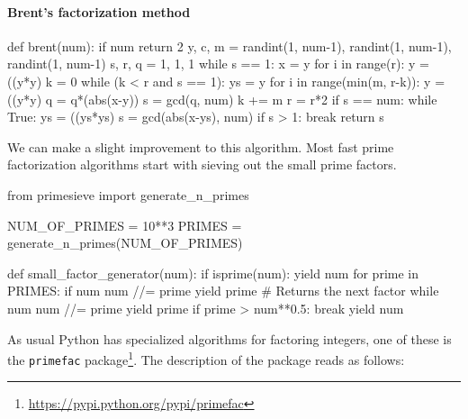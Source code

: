 \paragraph*{Brent's factorization method}
%
\begin{pythoncode}
	def brent(num):
	    if num %
	        return 2
	    y, c, m = randint(1, num-1), randint(1, num-1), randint(1, num-1)
	    s, r, q = 1, 1, 1
	    while s == 1:
	        x = y
	        for i in range(r):
	            y = ((y*y) %
	        k = 0
	        while (k < r and s == 1):
	            ys = y
	            for i in range(min(m, r-k)):
	                y = ((y*y) %
	                q = q*(abs(x-y)) %
	            s = gcd(q, num)
	            k += m
	        r = r*2
	    if s == num:
	        while True:
	            ys = ((ys*ys) %
	            s = gcd(abs(x-ys), num)
	            if s > 1:
	                break
	    return s
\end{pythoncode}
%
We can make a slight improvement to this algorithm. Most fast prime factorization algorithms start with sieving 
out the small prime factors. 
%
\begin{pythoncode}
	from primesieve import generate_n_primes
	
	NUM_OF_PRIMES = 10**3
	PRIMES = generate_n_primes(NUM_OF_PRIMES)
	
	def small_factor_generator(num):
	    if isprime(num):
	        yield num
	    for prime in PRIMES:
	        if num %
	            num //= prime
	            yield prime  # Returns the next factor
	            while num %
	                num //= prime
	                yield prime
	            if prime > num**0.5:
	                break
	    yield num
\end{pythoncode}
%
As usual Python has specialized algorithms for factoring integers, one of these is the \verb|primefac| 
package\footnote{\url{https://pypi.python.org/pypi/primefac}}. The description of the package reads as follows:

